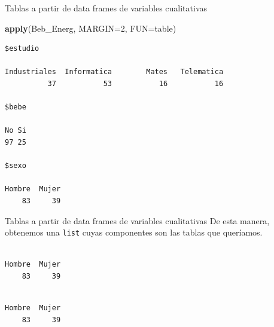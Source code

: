 \documentclass[
  ignorenonframetext,
  aspectratio=169]{beamer}
\newenvironment{Shaded}{\begin{snugshade}}{\end{snugshade}}
\newcommand{\AttributeTok}[1]{\textcolor[rgb]{0.13,0.29,0.53}{#1}}
\newcommand{\DecValTok}[1]{\textcolor[rgb]{0.00,0.00,0.81}{#1}}
\newcommand{\FunctionTok}[1]{\textcolor[rgb]{0.13,0.29,0.53}{\textbf{#1}}}
\newcommand{\NormalTok}[1]{#1}
\newcommand{\SpecialCharTok}[1]{\textcolor[rgb]{0.81,0.36,0.00}{\textbf{#1}}}
\begin{document}
\begin{frame}[fragile]{Tablas a partir de data frames de variables
cualitativas}
\label{tablas-a-partir-de-data-frames-de-variables-cualitativas-5}
\begin{Shaded}
\begin{Highlighting}[]
\FunctionTok{apply}\NormalTok{(Beb\_Energ, }\AttributeTok{MARGIN=}\DecValTok{2}\NormalTok{, }\AttributeTok{FUN=}\NormalTok{table)}
\end{Highlighting}
\end{Shaded}

\begin{verbatim}
$estudio

Industriales  Informatica        Mates   Telematica 
          37           53           16           16 

$bebe

No Si 
97 25 

$sexo

Hombre  Mujer 
    83     39 
\end{verbatim}
\end{frame}

\begin{frame}[fragile]{Tablas a partir de data frames de variables
cualitativas}
\label{tablas-a-partir-de-data-frames-de-variables-cualitativas-6}
De esta manera, obtenemos una \texttt{list} cuyas componentes son las
tablas que queríamos.

\begin{Shaded}
\end{Shaded}

\begin{verbatim}

Hombre  Mujer 
    83     39 
\end{verbatim}

\begin{Shaded}
\end{Shaded}

\begin{verbatim}

Hombre  Mujer 
    83     39 
\end{verbatim}
\end{frame}
\end{document}
